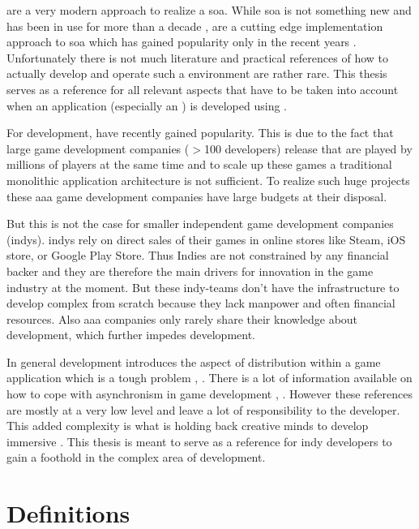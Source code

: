 \mss{} are a very modern approach to realize a \gls{soa}. While \gls{soa} is not
something new and has been in use for more than a decade \cite{josuttis2007soa},
\mss{} are a cutting edge implementation approach to \gls{soa} which has gained
popularity only in the recent years \cite{rajeev2016ms_popular}. Unfortunately
there is not much literature and practical references of how to actually develop
and operate such a \ms{} environment are rather rare. This thesis serves as a
reference for all relevant aspects that have to be taken into account when an
application (especially an \og{}) is developed using \mss{}.

For \og{} development, \mss{} have recently gained popularity. This is due to
the fact that large game development companies ($>$100 developers) release
\ogs{} that are played by millions of players at the same time
\cite{pronschinske2015turbine} and to scale up these games a traditional
monolithic application architecture is not sufficient. To realize such huge
\og{} projects these \gls{aaa} game development companies have large budgets at
their disposal.

But this is not the case for smaller independent game development companies
(\glspl{indy}). \Glspl{indy} rely on direct sales of their games in online
stores like Steam, iOS store, or Google Play Store. Thus Indies are not
constrained by any financial backer and they are therefore the main drivers for
innovation in the game industry at the moment. But these indy-teams don't have
the infrastructure to develop complex \ogs{} from scratch because they lack
manpower and often financial resources. Also \gls{aaa} companies only rarely
share their knowledge about \og{} development, which further impedes \og{}
development.

In general \og{} development introduces the aspect of distribution within a game
application which is a tough problem \cite{pneuli1990distributed},
\cite{kupermann2001synthesizing}. There is a lot of information available on how
to cope with asynchronism in game development \cite{gambetta_fast_paced},
\cite{gafferon2017games}. However these references are mostly at a very low
level and leave a lot of responsibility to the developer. This added complexity
is what is holding back creative minds to develop immersive \ogs{}. This thesis
is meant to serve as a reference for \gls{indy} developers to gain a foothold in
the complex area of \og{} development.

\section{Definitions}

